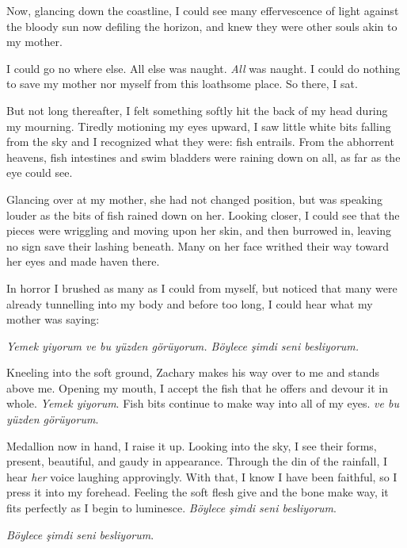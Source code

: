 \documentclass[11pt]{memoir}
\begin{document}
Now, glancing down the coastline, I could see many effervescence of light against the bloody sun now defiling the horizon, and knew they were other souls akin to my mother.

I could go no where else. All else was naught. \textit{All} was naught. I could do nothing to save my mother nor myself from this loathsome place. So there, I sat.

But not long thereafter, I felt something softly hit the back of my head during my mourning. Tiredly motioning my eyes upward, I saw little white bits falling from the sky and I recognized what they were: fish entrails. From the abhorrent heavens, fish intestines and swim bladders were raining down on all, as far as the eye could see.

Glancing over at my mother, she had not changed position, but was speaking louder as the bits of fish rained down on her. Looking closer, I could see that the pieces were wriggling and moving upon her skin, and then burrowed in, leaving no sign save their lashing beneath. Many on her face writhed their way toward her eyes and made haven there.

In horror I brushed as many as I could from myself, but noticed that many were already tunnelling into my body and before too long, I could hear what my mother was saying:

\vspace{5mm}
\textit{Yemek yiyorum ve bu yüzden görüyorum. Böylece şimdi seni besliyorum.}
\vspace{5mm}

Kneeling into the soft ground, Zachary makes his way over to me and stands above me. Opening my mouth, I accept the fish that he offers and devour it in whole. \textit{Yemek yiyorum}. Fish bits continue to make way into all of my eyes. \textit{ve bu yüzden görüyorum}.

Medallion now in hand, I raise it up. Looking into the sky, I see their forms, present, beautiful, and gaudy in appearance. Through the din of the rainfall, I hear \textit{her} voice laughing approvingly. With that, I know I have been faithful, so I press it into my forehead. Feeling the soft flesh give and the bone make way, it fits perfectly as I begin to luminesce. \textit{Böylece şimdi seni besliyorum}.

\vspace{5mm}
\textit{Böylece şimdi seni besliyorum}.


\end{document}
